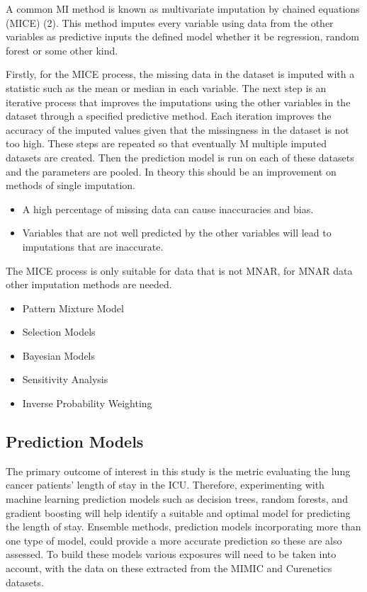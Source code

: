 \documentclass[11pt]{article}
\begin{document}
A common MI method is known as multivariate imputation by chained equations (MICE) (2). This method imputes every variable using data from the other variables as predictive inputs the defined model whether it be regression, random forest or some other kind.

Firstly, for the MICE process, the missing data in the dataset is imputed with a statistic such as the mean or median in each variable. The next step is an iterative process that improves the imputations using the other variables in the dataset through a specified predictive method. Each iteration improves the accuracy of the imputed values given that the missingness in the dataset is not too high. These steps are repeated so that eventually M multiple imputed datasets are created. Then the prediction model is run on each of these datasets and the parameters are pooled. In theory this should be an improvement on methods of single imputation.
\begin{itemize}
    \item A high percentage of missing data can cause inaccuracies and bias.
    \item Variables that are not well predicted by the other variables will lead to imputations that are inaccurate.
\end{itemize}

The MICE process is only suitable for data that is not MNAR, for MNAR data other imputation methods are needed.

\begin{itemize}
    \item Pattern Mixture Model
    \item Selection Models
    \item Bayesian Models
    \item Sensitivity Analysis
    \item Inverse Probability Weighting
\end{itemize}

\subsection{Prediction Models}
The primary outcome of interest in this study is the metric evaluating the lung cancer patients' length of stay in the ICU. Therefore, experimenting with machine learning prediction models such as decision trees, random forests, and gradient boosting will help identify a suitable and optimal model for predicting the length of stay. Ensemble methods, prediction models incorporating more than one type of model, could provide a more accurate prediction so these are also assessed. To build these models various exposures will need to be taken into account, with the data on these extracted from the MIMIC and Curenetics datasets.
\end{document}

